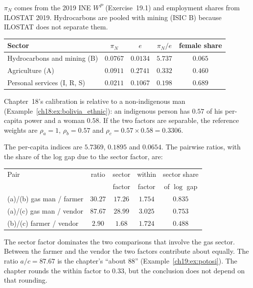 \documentclass[../solutions_manual.tex]{subfiles}
\begin{document}
 $\pi_N$ comes from the 2019 INE $W^P$ (Exercise~19.1) and employment shares from ILOSTAT 2019. Hydrocarbons are pooled with mining (ISIC B) because ILOSTAT does not separate them.
\begin{center}\small
\begin{tabular}{lcccc}
\toprule
Sector & $\pi_N$ & $e$ & $\pi_N/e$ & female share \\
\midrule
Hydrocarbons and mining (B) & $0.0767$ & $0.0134$ & $5.737$ & $0.065$ \\
Agriculture (A) & $0.0911$ & $0.2741$ & $0.332$ & $0.460$ \\
Personal services (I, R, S) & $0.0211$ & $0.1067$ & $0.198$ & $0.689$ \\
\bottomrule
\end{tabular}
\end{center}

 Chapter~18's calibration is relative to a non-indigenous man (Example~\ref{ch18:ex:bolivia_ethnic}): an indigenous person has $0.57$ of his per-capita power and a woman $0.58$. If the two factors are separable, the reference weights are $\rho_a = 1$, $\rho_b = 0.57$ and $\rho_c = 0.57 \times 0.58 = 0.3306$.

 The per-capita indices are $5.7369$, $0.1895$ and $0.0654$. The pairwise ratios, with the share of the log gap due to the sector factor, are:
\begin{center}\small
\begin{tabular}{lcccc}
\toprule
Pair & ratio & sector & within & sector share \\
& & factor & factor & of $\log$ gap \\
\midrule
(a)/(b) gas man / farmer & $30.27$ & $17.26$ & $1.754$ & $0.835$ \\
(a)/(c) gas man / vendor & $87.67$ & $28.99$ & $3.025$ & $0.753$ \\
(b)/(c) farmer / vendor & $2.90$ & $1.68$ & $1.724$ & $0.488$ \\
\bottomrule
\end{tabular}
\end{center}
The sector factor dominates the two comparisons that involve the gas sector. Between the farmer and the vendor the two factors contribute about equally. The ratio $a/c = 87.67$ is the chapter's ``about 88'' (Example~\ref{ch19:ex:potosi}). The chapter rounds the within factor to $0.33$, but the conclusion does not depend on that rounding.
\end{document}
